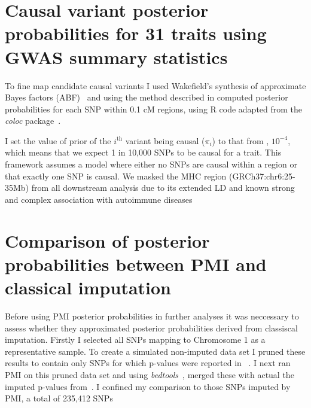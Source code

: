 \documentclass[a4paper,11pt]{report}
\begin{document}
\section{Causal variant posterior probabilities for 31 traits using GWAS summary statistics}
To fine map candidate causal variants I used Wakefield's synthesis of approximate Bayes factors (ABF)~\citep{Wakefield2009} and using the method described in \citet{The_Wellcome_Trust_Case_Control_Consortium2012-ad} computed posterior probabilities for each SNP within 0.1 cM regions, using R code adapted from the \textit{coloc} package~\citep{GiambartolomeiVukcevicSchadtEtAl2014}.  

I set the value of prior of the $i^\text{th}$ variant being causal ($\pi_{i}$) to that from \citet{GiambartolomeiVukcevicSchadtEtAl2014}, $10^{-4}$, which means that we expect 1 in 10,000 SNPs to be causal for a trait. This framework assumes a model where either no SNPs are causal within a region or that exactly one SNP is causal. We masked the MHC region (GRCh37:chr6:25-35Mb) from all downstream analysis due to its extended LD and known strong and complex association with autoimmune diseases

\section{Comparison of posterior probabilities between PMI and classical imputation}
Before using PMI posterior probabilities in further analyses it was neccessary to assess whether they approximated posterior probabilities derived from classiscal imputation. Firstly I selected all SNPs mapping to Chromosome 1 as a representative sample. To create a simulated non-imputed data set I pruned these results to contain only SNPs for which p-values were reported in ~\citet{Stahl2010-wz}. I next ran PMI on this pruned data set and using \textit{bedtools}~\citep{Quinlan2014}, merged these with actual the imputed p-values from~\citet{Okada2014-um}. I confined my comparison to those SNPs imputed by PMI, a total of 235,412 SNPs

\

\end{document}
